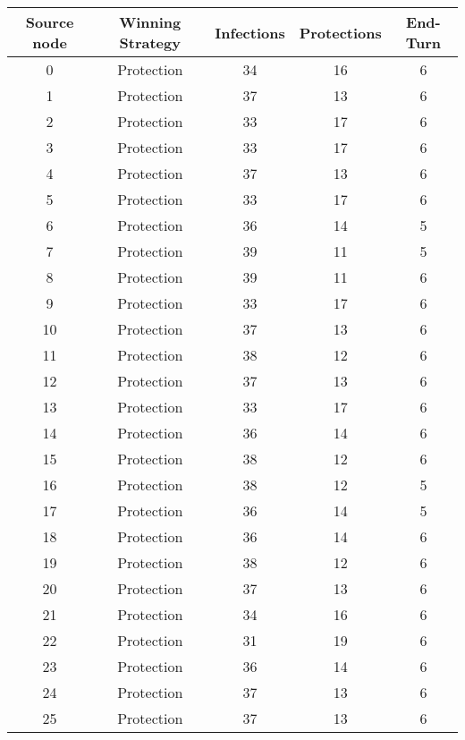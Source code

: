 \documentclass[results.tex]{subfiles}
\begin{document}
\begin{center}
  \begin{tabular}{| c || c | c | c | c |}
    \hline
    {\bfseries Source node} & {\bfseries Winning Strategy} & {\bfseries Infections} & {\bfseries Protections} & {\bfseries End-Turn} \\  %
    \hline\hline
    0 & Protection & 34 & 16 & 6 \\ 
    \hline
    1 & Protection & 37 & 13 & 6 \\ 
    \hline
    2 & Protection & 33 & 17 & 6 \\ 
    \hline
    3 & Protection & 33 & 17 & 6 \\ 
    \hline
    4 & Protection & 37 & 13 & 6 \\ 
    \hline
    5 & Protection & 33 & 17 & 6 \\ 
    \hline
    6 & Protection & 36 & 14 & 5 \\ 
    \hline
    7 & Protection & 39 & 11 & 5 \\ 
    \hline
    8 & Protection & 39 & 11 & 6 \\ 
    \hline
    9 & Protection & 33 & 17 & 6 \\ 
    \hline
    10 & Protection & 37 & 13 & 6 \\ 
    \hline
    11 & Protection & 38 & 12 & 6 \\ 
    \hline
    12 & Protection & 37 & 13 & 6 \\ 
    \hline
    13 & Protection & 33 & 17 & 6 \\ 
    \hline
    14 & Protection & 36 & 14 & 6 \\ 
    \hline
    15 & Protection & 38 & 12 & 6 \\ 
    \hline
    16 & Protection & 38 & 12 & 5 \\ 
    \hline
    17 & Protection & 36 & 14 & 5 \\ 
    \hline
    18 & Protection & 36 & 14 & 6 \\ 
    \hline
    19 & Protection & 38 & 12 & 6 \\ 
    \hline
    20 & Protection & 37 & 13 & 6 \\ 
    \hline
    21 & Protection & 34 & 16 & 6 \\ 
    \hline
    22 & Protection & 31 & 19 & 6 \\ 
    \hline
    23 & Protection & 36 & 14 & 6 \\ 
    \hline
    24 & Protection & 37 & 13 & 6 \\ 
    \hline
    25 & Protection & 37 & 13 & 6 \\ 

\end{tabular}
\end{center}
\end{document}
